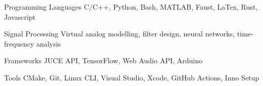 

\begin{cvskills}

    \cvskill
    {Programming Languages} %
    {C/C++, Python, Bash, MATLAB, Faust, LaTex, Rust, Javascript} %

    \cvskill
    {Signal Processing} %
    {Virtual analog modelling, filter design, neural networks, time-frequency analysis} %

    \cvskill
    {Frameworks} %
    {JUCE API, TensorFlow, Web Audio API, Arduino} %

    \cvskill
    {Tools} %
    {CMake, Git, Linux CLI, Visual Studio, Xcode, GitHub Actions, Inno Setup} %

\end{cvskills}
